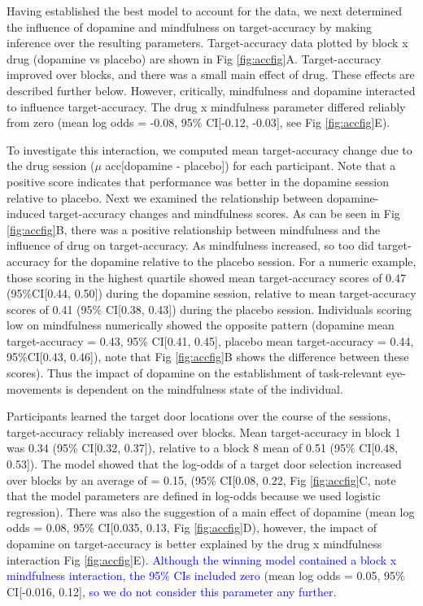\documentclass[
  man]{apa6}
\begin{document}
Having established the best model to account for the data, we next determined the influence of dopamine and mindfulness on target-accuracy by making inference over the resulting parameters. Target-accuracy data plotted by block x drug (dopamine vs placebo) are shown in Fig \ref{fig:accfig}A. Target-accuracy improved over blocks, and there was a small main effect of drug. These effects are described further below. However, critically, mindfulness and dopamine interacted to influence target-accuracy. The drug x mindfulness parameter differed reliably from zero (mean log odds = -0.08, 95\% CI{[}-0.12, -0.03{]}, see Fig \ref{fig:accfig}E).

To investigate this interaction, we computed mean target-accuracy change due to the drug session (\(\mu\) acc{[}dopamine - placebo{]}) for each participant. Note that a positive score indicates that performance was better in the dopamine session relative to placebo. Next we examined the relationship between dopamine-induced target-accuracy changes and mindfulness scores. As can be seen in Fig \ref{fig:accfig}B, there was a positive relationship between mindfulness and the influence of drug on target-accuracy. As mindfulness increased, so too did target-accuracy for the dopamine relative to the placebo session. For a numeric example, those scoring in the highest quartile showed mean target-accuracy scores of 0.47 (95\%CI{[}0.44, 0.50{]}) during the dopamine session, relative to mean target-accuracy scores of 0.41 (95\% CI{[}0.38, 0.43{]}) during the placebo session. Individuals scoring low on mindfulness numerically showed the opposite pattern (dopamine mean target-accuracy = 0.43, 95\% CI{[}0.41, 0.45{]}, placebo mean target-accuracy = 0.44, 95\%CI{[}0.43, 0.46{]}), note that Fig \ref{fig:accfig}B shows the difference between these scores). Thus the impact of dopamine on the establishment of task-relevant eye-movements is dependent on the mindfulness state of the individual.

Participants learned the target door locations over the course of the sessions, target-accuracy reliably increased over blocks. Mean target-accuracy in block 1 was 0.34 (95\% CI{[}0.32, 0.37{]}), relative to a block 8 mean of 0.51 (95\% CI{[}0.48, 0.53{]}). The model showed that the log-odds of a target door selection increased over blocks by an average of = 0.15, (95\% CI{[}0.08, 0.22, Fig \ref{fig:accfig}C, note that the model parameters are defined in log-odds because we used logistic regression). There was also the suggestion of a main effect of dopamine (mean log odds = 0.08, 95\% CI{[}0.035, 0.13, Fig \ref{fig:accfig}D), however, the impact of dopamine on target-accuracy is better explained by the drug x mindfulness interaction Fig \ref{fig:accfig}E). \textcolor{blue}{Although the winning model contained a block x mindfulness interaction, the 95\% CIs included zero} (mean log odds = 0.05, 95\% CI{[}-0.016, 0.12{]}, \textcolor{blue}{so we do not consider this parameter any further.}
\end{document}
